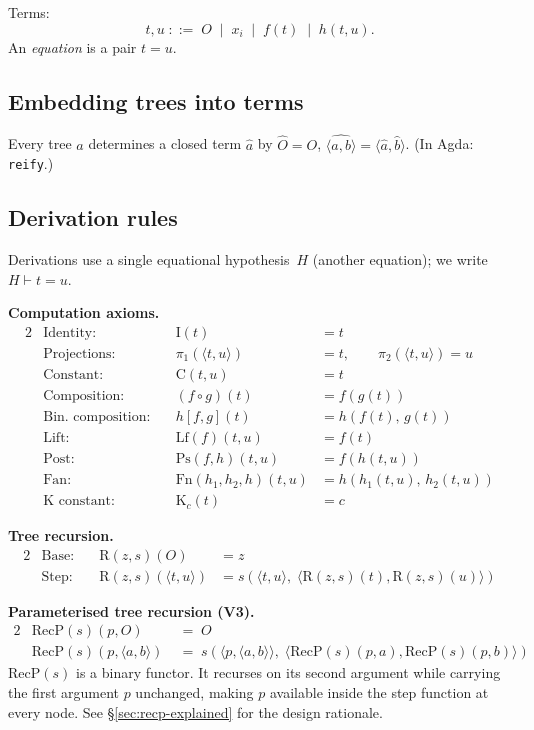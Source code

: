 \documentclass[11pt]{article}
\newcommand{\pair}[2]{\langle #1, #2 \rangle}
\newcommand{\reify}[1]{\widehat{#1}}
\newcommand{\RecP}{\mathrm{RecP}}
\begin{document}
Terms:
\[
  t, u \;::=\; O \;\mid\; x_i \;\mid\; f(t) \;\mid\; h(t, u).
\]
An \emph{equation} is a pair $t = u$.

\subsection{Embedding trees into terms}

Every tree $a$ determines a closed term $\reify{a}$ by
$\reify{O} = O$, $\reify{\pair{a}{b}} = \pair{\reify{a}}{\reify{b}}$.
(In Agda: \verb|reify|.)

\subsection{Derivation rules}

Derivations use a single equational hypothesis~$H$ (another equation);
we write $H \vdash t = u$.

\medskip\noindent
\textbf{Computation axioms.}
\begin{alignat*}{2}
  &\text{Identity:}          &\quad \mathrm{I}(t) &= t \\
  &\text{Projections:}        &\quad \pi_1(\pair{t}{u}) &= t, \qquad \pi_2(\pair{t}{u}) = u \\
  &\text{Constant:}          &\quad \mathrm{C}(t, u) &= t \\
  &\text{Composition:}       &\quad (f \circ g)(t) &= f(g(t)) \\
  &\text{Bin. composition:}&\quad h[f,g](t) &= h(f(t),\, g(t)) \\
  &\text{Lift:}              &\quad \mathrm{Lf}(f)(t, u) &= f(t) \\
  &\text{Post:}              &\quad \mathrm{Ps}(f, h)(t, u) &= f(h(t,u)) \\
  &\text{Fan:}               &\quad \mathrm{Fn}(h_1,h_2,h)(t,u)
                                      &= h(h_1(t,u),\, h_2(t,u)) \\
  &\text{K constant:}  &\quad \mathrm{K}_c(t) &= c
\end{alignat*}

\textbf{Tree recursion.}
\begin{alignat*}{2}
  &\text{Base:} &\quad \mathrm{R}(z, s)(O) &= z \\
  &\text{Step:} &\quad \mathrm{R}(z, s)(\pair{t}{u})
    &= s(\pair{t}{u},\; \pair{\mathrm{R}(z,s)(t)}{\mathrm{R}(z,s)(u)})
\end{alignat*}

\textbf{Parameterised tree recursion (V3).}
\begin{alignat*}{2}
  &\RecP(s)(p, O) &\;=\; O \\
  &\RecP(s)(p, \pair{a}{b}) &\;=\; s(\pair{p}{\pair{a}{b}},\;
       \pair{\RecP(s)(p,a)}{\RecP(s)(p,b)})
\end{alignat*}
$\RecP(s)$ is a binary functor.  It recurses on its second argument
while carrying the first argument $p$ unchanged, making $p$ available
inside the step function at every node.  See
\S\ref{sec:recp-explained} for the design rationale.
\end{document}

